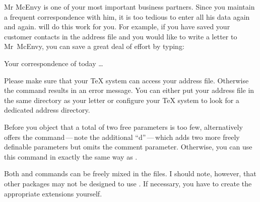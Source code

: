 \begin{Example}
  Mr McEnvy is one of your most important business partners. Since you
  maintain a frequent correspondence with him, it is too tedious to
  enter all his data again and again. \KOMAScript{} will do this work for you.
  For example, if you have saved your customer contacts in the
   address file and you would like to write a letter to
  Mr~McEnvy, you can save a great deal of effort by typing:
  \begin{lstcode}
    
    \begin{letter}{\FLANN}
      Your correspondence of today \dots
    \end{letter}
  \end{lstcode}
  Please make sure that your {\TeX} system can access your address file.
  Otherwise the  command results in an error message. You can
  either put your address file in the same directory as your letter or
  configure your \TeX{} system to look for a dedicated address directory.
\end{Example}
% 
\EndIndexGroup


\begin{Declaration}
\end{Declaration}%
Before you object that a total of two free parameters is too few,
\KOMAScript{} alternatively offers the  command\,---\,note
the additional ``d''\,---\,which adds two more freely definable parameters but
omits the comment parameter. Otherwise, you can use this command in exactly
the same way as .

Both  and  commands can be
freely mixed in the  files. I should note, however, that other
packages may not be designed to use . If necessary, you have
to create the appropriate extensions yourself.%
%
\EndIndexGroup

